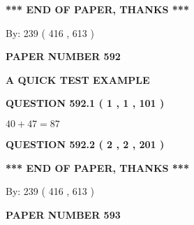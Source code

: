 \documentclass[12pt]{article}
\begin{document}
   
   
\vspace{1.0in} 
{\textbf{\large{ *** END OF PAPER, THANKS *** }}} 
   
   
\hspace{1.0in} By: 
 239 ( 416 ,  613 )
   
   
   
   
\newpage 
\setcounter{page}{ 
   592001 } 
   
   
   
   
 {\textbf{ \Large{ PAPER NUMBER  592  }}}
   
   
\vspace{0.2in}
   
   
   
   
   
   
 \vspace{0.2in}
{\LARGE {\textbf{ A QUICK TEST EXAMPLE}}}
   
   
  
\vspace{0.2in}
  
{\textbf{\Large{QUESTION
592.1 
 ( 1 , 1 , 101 )
}}}
  
  
 
 

$ %
40 +  %
47=   %
87$
 
 
  
\vspace{0.2in}
  
{\textbf{\Large{QUESTION
592.2 
 ( 2 , 2 , 201 )
}}}
  
  
   
   
 \vspace{0.2in}
 
   
   
   
   
\vspace{1.0in} 
{\textbf{\large{ *** END OF PAPER, THANKS *** }}} 
   
   
\hspace{1.0in} By: 
 239 ( 416 ,  613 )
   
   
   
   
\newpage 
\setcounter{page}{ 
   593001 } 
   
   
   
   
 {\textbf{ \Large{ PAPER NUMBER  593  }}}
   
   
\vspace{0.2in}
   
\end{document}
